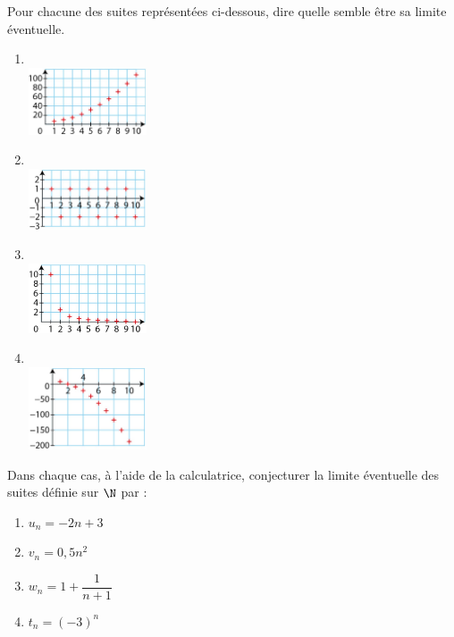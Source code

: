 \documentclass[a4paper,11pt,exos]{nsi} %
\begin{document}
\exo{}
Pour chacune des suites représentées ci-dessous, dire quelle semble être sa limite éventuelle.
\begin{multicols}{4}
    \begin{enumerate}
        \item $\ $\\
        \includegraphics[width=3.5cm]{graphique_a.jpg}
        \item $\ $\\
        \includegraphics[width=3.5cm]{graphique_b.jpg}
        \item $\ $\\
        \includegraphics[width=3.5cm]{graphique_c.jpg}
        \item $\ $\\
        \includegraphics[width=3.5cm]{graphique_d.jpg}
    \end{enumerate}
\end{multicols}

\exo{ \faCalculator}
Dans chaque cas, à l'aide de la calculatrice, conjecturer la limite éventuelle des suites définie sur $\N$ par :
\begin{multicols}{4}
    \begin{enumerate}
        \item $u_n=-2n+3$
        \item $v_n=0,5 n^2$
        \item $w_n=1+\dfrac{1}{n+1}$
        \item $t_n=(-3)^n$
    \end{enumerate}
\end{multicols}
\end{document}
